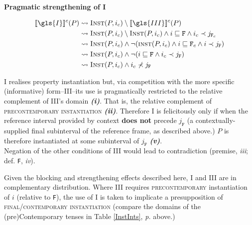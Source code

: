 \pex\textbf{Pragmatic strengthening of I}



\begin{align}
	\denote[c]{\gls{I}}(P)&\rightsquigarrow \textsc{Inst}(P,i_c)\setminus\denote[c]{\gls{III}}(P) \\
	&\rightsquigarrow \textsc{Inst}(P,i_c)\setminus \textsc{Inst}(P,i_c)\wedge i\sqsubseteq\mathtt{F}\wedge i_c\prec j_{\mathtt{F}_c}\\
	&\rightsquigarrow \textsc{Inst}(P,i_c)\wedge\neg(\textsc{inst}(P,i_c)\wedge i\sqsubseteq\texttt{F}_c\wedge i\prec j_{\texttt{F}})\\
	&\rightsquigarrow\textsc{Inst}(P,i_c)\wedge\neg(i\sqsubseteq\texttt{F}\wedge i_c\prec j_{\texttt{F}}) \\
	&\rightsquigarrow\textsc{Inst}(P,i_c)\wedge i_c\nprec j_{\texttt{F}}
\end{align}

\small\gls{I} realises property instantiation but, via competition with the more specific (informative) form--\gls{III}--its use is pragmatically restricted to the relative complement of \gls{III}'s domain \textbf{\textit{(i)}}. That is, the relative complement of \textsc{precontemporary instantiation} \textbf{\textit{(ii)}}. Therefore \gls{I} is felicitously only if when the reference interval provided by context \textbf{does not} precede $ j_{\texttt{F}} $ (a contextually-supplied final subinterval of the reference frame, as described above.) $ P $ is therefore instantiated at some subinterval of $ j_{\texttt{F}} $ \textbf{\textit{(v)}}.\\Negation of the other conditions of \gls{III} would lead to contradiction (premise, \textit{iii}; def. \texttt{F}, \textit{iv}).
\xe

Given the blocking and strengthening effects described here, \gls{I} and \gls{III} are in complementary distribution. Where \gls{III} requires \textsc{precontemporary} instantiation of $ i $ (relative to \texttt{F}), the use of \gls{I} is taken to implicate a presupposition of \textsc{final/contemporary instantiation} (compare the domains of the (pre)Contemporary tenses in Table \ref{InstInts}, \textit{p. \pageref{InstInts}} above.) 

